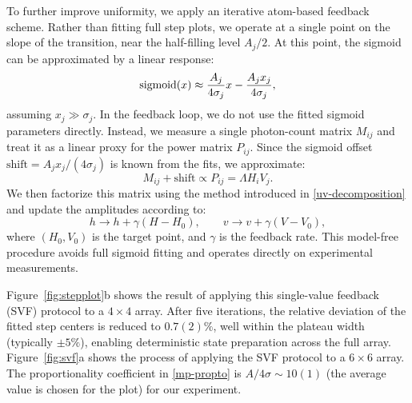 To further improve uniformity, we apply an iterative atom-based feedback scheme. Rather than fitting full step plots, we operate at a single point on the slope of the transition, near the half-filling level $A_j / 2$. At this point, the sigmoid can be approximated by a linear response:
\begin{equation*}
    \mathop{\mathrm{sigmoid}}\nolimits(x) \approx \frac{A_j}{4 \sigma_j} x - \frac{A_j x_j}{4 \sigma_j},
\end{equation*}
assuming $x_j \gg \sigma_j$.  In the feedback loop, we do not use the fitted sigmoid parameters directly. Instead, we measure a single photon-count matrix $M_{ij}$ and treat it as a linear proxy for the power matrix $P_{ij}$. Since the sigmoid offset $\mathrm{shift} = A_j x_j / (4 \sigma_j)$ is known from the fits, we approximate:
\begin{equation}
    \label{mp-propto}
    M_{ij} + \mathrm{shift} \propto P_{ij} = \Lambda H_i V_j.
\end{equation}
We then factorize this matrix using the method introduced in \eqref{uv-decomposition} and update the amplitudes according to:
\begin{equation*}
    h \rightarrow h + \gamma (H - H_0), \qquad
    v \rightarrow v + \gamma (V - V_0),
\end{equation*}
where $(H_0, V_0)$ is the target point, and $\gamma$ is the feedback rate. This model-free procedure avoids full sigmoid fitting and operates directly on experimental measurements.

Figure~\ref{fig:stepplot}b shows the result of applying this single-value feedback (SVF) protocol to a $4 \times 4$ array. After five iterations, the relative deviation of the fitted step centers is reduced to $0.7(2)\%$, well within the plateau width (typically $\pm5\%$), enabling deterministic state preparation across the full array.
Figure~\ref{fig:svf}a shows the process of applying the SVF protocol to a $6 \times 6$ array. The proportionality coefficient in \eqref{mp-propto} is $A/4\sigma \sim 10(1)$ (the average value is chosen for the plot) for our experiment.




